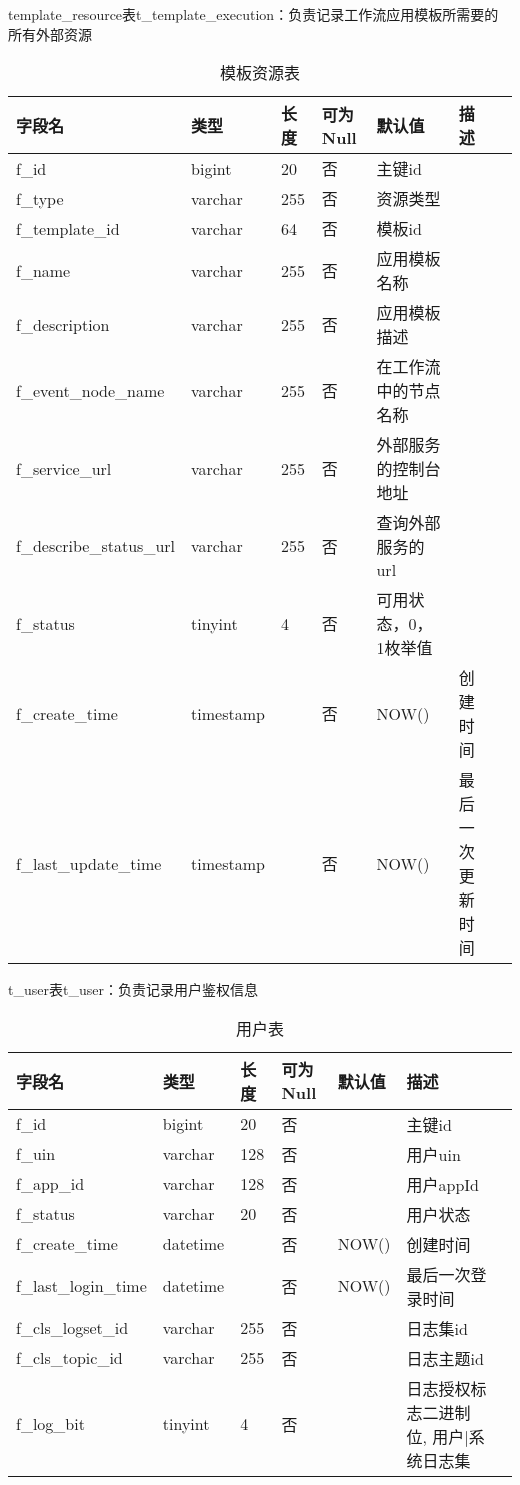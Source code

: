 template\_resource表t\_template\_execution：负责记录工作流应用模板所需要的所有外部资源
\begin{table}[H]
    \centering
    \caption{模板资源表}
    \label{tab:t_template_resource}
    \begin{tabular}{lllllll}
        \toprule
        字段名	&类型	&长度	&可为Null&默认值	&描述 \\
        \midrule
        f\_id	&bigint	&20 &否 & 主键id\\
        f\_type	&varchar	&255 &否 & 资源类型\\
        f\_template\_id	&varchar	&64 &否 & 模板id\\
        f\_name	&varchar	&255 &否 & 应用模板名称\\
        f\_description	&varchar	&255 &否 & 应用模板描述\\
        f\_event\_node\_name	&varchar	&255 &否 & 在工作流中的节点名称\\
        f\_service\_url	&varchar	&255 &否 & 外部服务的控制台地址\\
        f\_describe\_status\_url	&varchar	&255 &否 & 查询外部服务的url\\
        f\_status	&tinyint	&4 &否 & 可用状态，0， 1枚举值\\
        f\_create\_time	&timestamp	& &否 &NOW() & 创建时间\\
        f\_last\_update\_time	&timestamp	& &否 &NOW() & 最后一次更新时间\\
        \bottomrule
    \end{tabular}
\end{table}

t\_user表t\_user：负责记录用户鉴权信息
\begin{table}[H]
    \centering
    \caption{用户表}
    \label{tab:t_user}
    \begin{tabular}{lllllll}
        \toprule
        字段名	&类型	&长度	&可为Null &默认值	&描述 \\
        \midrule
        f\_id	&bigint	&20 &否 && 主键id\\
        f\_uin	&varchar	&128 &否 && 用户uin\\
        f\_app\_id	&varchar	&128 &否 && 用户appId\\
        f\_status	&varchar	&20 &否 && 用户状态\\
        f\_create\_time	&datetime	& &否 &NOW()  & 创建时间\\
        f\_last\_login\_time	&datetime	& &否 &NOW()  & 最后一次登录时间\\
        f\_cls\_logset\_id	&varchar	&255 &否 && 日志集id\\
        f\_cls\_topic\_id	&varchar	&255 &否 && 日志主题id\\
        f\_log\_bit	&tinyint	&4 &否 && 日志授权标志二进制位, 用户|系统日志集\\
        \bottomrule
    \end{tabular}
\end{table}
